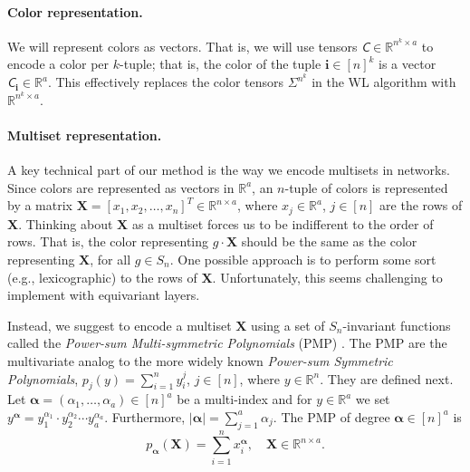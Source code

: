 \documentclass{article}
\newcommand{\abs}[1]{\left\vert#1\right\vert}
\newcommand{\Real}{\mathbb R}
\newcommand{\eg}{{e.g.}}
\def\vi{{\bm{i}}}
\def\valpha{{\bm{\alpha}}}
\def\mX{{\bm{X}}}
\newcommand{\tens}[1]{\bm{\mathsfit{#1}}}
\def\tC{{\tens{C}}}
\begin{document}
\vspace{-3pt}
\paragraph{Color representation.}\vspace{-3pt}
We will represent colors as vectors. That is, we will use tensors $\tC\in \Real^{n^k\times a}$ to encode a color per $k$-tuple; that is, the color of the tuple $\vi\in[n]^k$ is a vector $\tC_\vi \in \Real^a$. This effectively replaces the color tensors $\Sigma^{n^k}$ in the WL algorithm with $\Real^{n^k\times a}$.

\vspace{-3pt}
\paragraph{Multiset representation.}\vspace{-3pt}
A key technical part of our method is the way we encode multisets in networks. Since colors are represented as vectors in $\Real^a$, an $n$-tuple of colors is represented by a matrix $\mX=[x_1,x_2,\ldots,x_n]^T\in\Real^{n \times a}$, where $x_j\in\Real^a$, $j\in[n]$ are the rows of $\mX$. Thinking about $\mX$ as a multiset forces us to be indifferent to the order of rows. That is, the color representing $g\cdot \mX$ should be the same as the color representing $\mX$, for all $g\in S_n$. One possible approach is to perform some sort (\eg, lexicographic) to the rows of $\mX$. Unfortunately, this seems challenging to implement with equivariant layers. 

Instead, we suggest to encode a multiset $\mX$ using a set of $S_n$-invariant functions called the \emph{Power-sum Multi-symmetric Polynomials} (PMP) \citep{briand2004algebra,rydh2007minimal}. The PMP are the multivariate analog to the more widely known \emph{Power-sum Symmetric Polynomials}, $p_j(y)=\sum_{i=1}^n y_i^j$, $j\in [n]$, where $y\in \Real^n$. They are defined next. 
Let $\valpha=(\alpha_1,\ldots,\alpha_a)\in[n]^a$ be a multi-index and for $y\in\Real^a$ we set $y^\valpha = y_1^{\alpha_1} \cdot y_2^{\alpha_2} \cdots y_a^{\alpha_a}$. Furthermore, $\abs{\valpha} = \sum_{j=1}^a \alpha_j$. The PMP of degree $\valpha\in [n]^a$ is 
$$p_\valpha(\mX) = \sum_{i=1}^{n} x_i^\valpha, \quad \mX\in\Real^{n\times a}.$$ 
\end{document}
